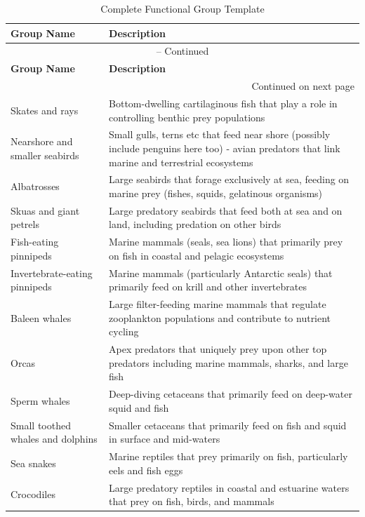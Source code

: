   \begin{longtable}{p{}p{}}
  \caption{Complete Functional Group Template\label{tab:functional_groups}} \\
  \hline
  \textbf{Group Name} & \textbf{Description} \\
  \hline
  \endfirsthead
  \multicolumn{2}{c}{{\tablename} \thetable{} -- Continued} \\
  \hline
  \textbf{Group Name} & \textbf{Description} \\
  \hline
  \endhead
  \hline
  \multicolumn{2}{r}{{Continued on next page}} \\
  \endfoot
  \hline
  \endlastfoot
  Skates and rays & Bottom-dwelling cartilaginous fish that play a role in controlling benthic prey populations \\
  Nearshore and smaller seabirds & Small gulls, terns etc that feed near shore (possibly include penguins here too) - avian predators that link marine and terrestrial ecosystems \\
  Albatrosses & Large seabirds that forage exclusively at sea, feeding on marine prey (fishes, squids, gelatinous organisms) \\
  Skuas and giant petrels & Large predatory seabirds that feed both at sea and on land, including predation on other birds \\
  Fish-eating pinnipeds & Marine mammals (seals, sea lions) that primarily prey on fish in coastal and pelagic ecosystems \\
  Invertebrate-eating pinnipeds & Marine mammals (particularly Antarctic seals) that primarily feed on krill and other invertebrates \\
  Baleen whales & Large filter-feeding marine mammals that regulate zooplankton populations and contribute to nutrient cycling \\
  Orcas & Apex predators that uniquely prey upon other top predators including marine mammals, sharks, and large fish \\
  Sperm whales & Deep-diving cetaceans that primarily feed on deep-water squid and fish \\
  Small toothed whales and dolphins & Smaller cetaceans that primarily feed on fish and squid in surface and mid-waters \\
  Sea snakes & Marine reptiles that prey primarily on fish, particularly eels and fish eggs \\
  Crocodiles & Large predatory reptiles in coastal and estuarine waters that prey on fish, birds, and mammals \\

\end{longtable}
